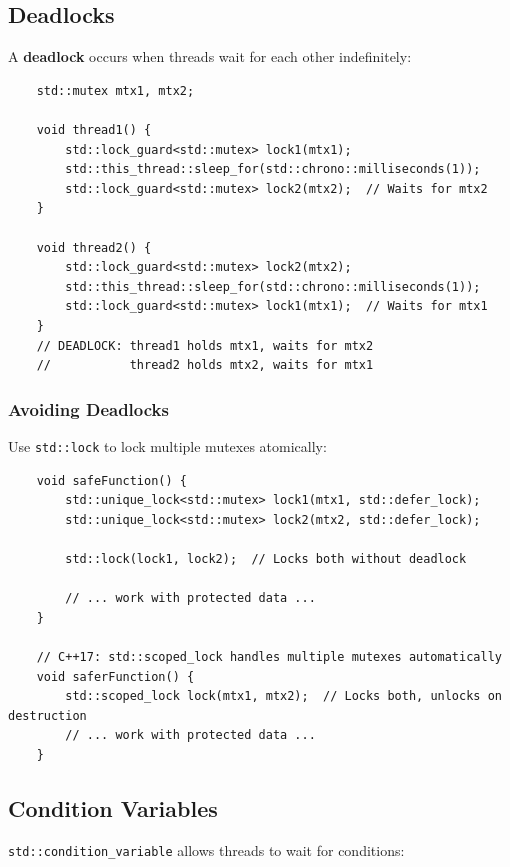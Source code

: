 \subsection{Deadlocks}

A \textbf{deadlock} occurs when threads wait for each other indefinitely:

\begin{lstlisting}
	std::mutex mtx1, mtx2;
	
	void thread1() {
		std::lock_guard<std::mutex> lock1(mtx1);
		std::this_thread::sleep_for(std::chrono::milliseconds(1));
		std::lock_guard<std::mutex> lock2(mtx2);  // Waits for mtx2
	}
	
	void thread2() {
		std::lock_guard<std::mutex> lock2(mtx2);
		std::this_thread::sleep_for(std::chrono::milliseconds(1));
		std::lock_guard<std::mutex> lock1(mtx1);  // Waits for mtx1
	}
	// DEADLOCK: thread1 holds mtx1, waits for mtx2
	//           thread2 holds mtx2, waits for mtx1
\end{lstlisting}

\subsubsection{Avoiding Deadlocks}

Use \texttt{std::lock} to lock multiple mutexes atomically:

\begin{lstlisting}
	void safeFunction() {
		std::unique_lock<std::mutex> lock1(mtx1, std::defer_lock);
		std::unique_lock<std::mutex> lock2(mtx2, std::defer_lock);
		
		std::lock(lock1, lock2);  // Locks both without deadlock
		
		// ... work with protected data ...
	}
	
	// C++17: std::scoped_lock handles multiple mutexes automatically
	void saferFunction() {
		std::scoped_lock lock(mtx1, mtx2);  // Locks both, unlocks on destruction
		// ... work with protected data ...
	}
\end{lstlisting}

\subsection{Condition Variables}

\texttt{std::condition\_variable} allows threads to wait for conditions:

